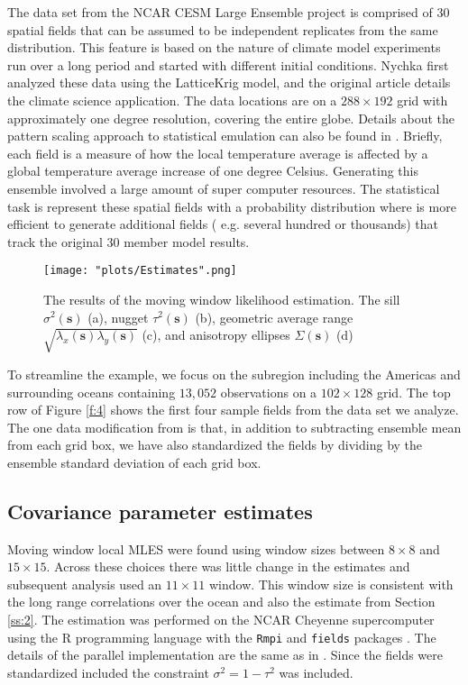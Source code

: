 \documentclass[review]{elsarticle}
\begin{document}
The data set from the NCAR CESM Large Ensemble project \cite{kay2015community} is comprised of 30 spatial fields that can be assumed to be independent replicates from the same distribution. This feature is based on the nature of  climate model experiments run over a long period and started with different initial conditions. Nychka \cite{nychka2018modeling} first analyzed these data using the LatticeKrig model, and the original article details the climate science application. The data locations are on a $288 \times 192$ grid with approximately one degree resolution, covering the entire globe.  Details about the pattern scaling approach to statistical emulation can also be found in \cite{alexeeff2018emulating}. Briefly, each field is a measure of how the local temperature average is affected by a global temperature average increase of one degree Celsius.  Generating this ensemble involved a large amount of super computer resources. 
The statistical task is represent these spatial fields with a probability distribution where is more efficient to generate additional fields ( e.g. several hundred or thousands)  that track the original 30 member model results. 

\begin{figure}
    \centering
    \texttt{[image: "plots/Estimates".png]}
    \caption{The results of the moving window likelihood estimation. The sill $\sigma^2( \mathbf s)$ (a), nugget $\tau^2( \mathbf s)$ (b), geometric average range $\sqrt{\lambda_x ( \mathbf s) \lambda_y ( \mathbf s)}$ (c), and anisotropy ellipses $\Sigma ( \mathbf s)$ (d)}
    \label{f:3}
\end{figure}

To streamline the example, we focus on the subregion including the Americas and surrounding oceans containing $13,052$ observations on a $102 \times 128$ grid. The top row of Figure \ref{f:4} shows the first four sample fields from the data set we analyze. The one data modification from \cite{nychka2018modeling} is that, in addition to subtracting ensemble mean from  each grid box, we have also standardized the fields by dividing by the ensemble standard deviation of each grid box.

\subsection{Covariance parameter estimates}

 Moving window local MLES were found using  window sizes between $8 \times 8$ and $15 \times 15$. Across these choices there was little change in the estimates and subsequent analysis used an  $11 \times 11$ window. This window size is consistent with the long range correlations over the ocean and also the estimate from Section \ref{ss:2}. The estimation was performed on the NCAR Cheyenne supercomputer \cite{cheyenne} using the R programming language \cite{Rcore} with the \texttt{Rmpi} \cite{yu2002rmpi} and \texttt{fields} packages \cite{fields}. The details of the parallel implementation are the same as in \cite{nychka2018modeling}. Since the fields were standardized included the constraint $\sigma^2 = 1 - \tau^2$ was included. 
\end{document}
